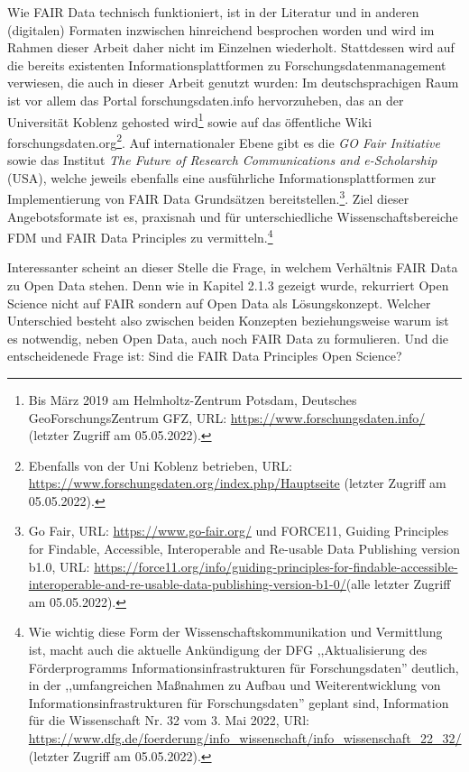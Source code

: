Wie FAIR Data technisch funktioniert, ist in der Literatur und in anderen (digitalen) Formaten inzwischen hinreichend besprochen worden und wird im Rahmen dieser Arbeit daher nicht im Einzelnen wiederholt. Stattdessen wird auf die bereits existenten Informationsplattformen zu Forschungsdatenmanagement verwiesen, die auch in dieser Arbeit genutzt wurden: Im deutschsprachigen Raum ist vor allem das Portal forschungsdaten.info hervorzuheben, das an der Universität Koblenz gehosted wird\footnote{Bis März 2019 am Helmholtz-Zentrum Potsdam, Deutsches GeoForschungsZentrum GFZ, URL: \url{https://www.forschungsdaten.info/} (letzter Zugriff am 05.05.2022).} sowie auf das öffentliche Wiki forschungsdaten.org\footnote{Ebenfalls von der Uni Koblenz betrieben, URL: \url{https://www.forschungsdaten.org/index.php/Hauptseite} (letzter Zugriff am 05.05.2022).}. Auf internationaler Ebene gibt es die \textit{GO Fair Initiative} sowie das Institut \textit{The Future of Research Communications and e-Scholarship} (USA), welche jeweils ebenfalls eine ausführliche Informationsplattformen zur Implementierung von FAIR Data Grundsätzen bereitstellen.\footnote{Go Fair, URL: \url{https://www.go-fair.org/} und FORCE11, Guiding Principles for Findable, Accessible, Interoperable and Re-usable Data Publishing version b1.0, URL: \url{https://force11.org/info/guiding-principles-for-findable-accessible-interoperable-and-re-usable-data-publishing-version-b1-0/}(alle letzter Zugriff am 05.05.2022).}. Ziel dieser Angebotsformate ist es, praxisnah und für unterschiedliche Wissenschaftsbereiche FDM und FAIR Data Principles zu vermitteln.\footnote{Wie wichtig diese Form der Wissenschaftskommunikation und Vermittlung ist, macht auch die aktuelle Ankündigung der DFG ,,Aktualisierung des Förderprogramms Informationsinfrastrukturen für Forschungsdaten'' deutlich, in der ,,umfangreichen Maßnahmen zu Aufbau und Weiterentwicklung von Informationsinfrastrukturen für Forschungsdaten'' geplant sind, Information für die Wissenschaft Nr. 32 vom 3. Mai 2022, URl: \url{https://www.dfg.de/foerderung/info_wissenschaft/info_wissenschaft_22_32/} (letzter Zugriff am 05.05.2022).}

Interessanter scheint an dieser Stelle die Frage, in welchem Verhältnis FAIR Data zu Open Data stehen. Denn wie in Kapitel 2.1.3 gezeigt wurde, rekurriert Open Science nicht auf FAIR sondern auf Open Data als Lösungskonzept. Welcher Unterschied besteht also zwischen beiden Konzepten beziehungsweise warum ist es notwendig, neben Open Data, auch noch FAIR Data zu formulieren. Und die entscheidenede Frage ist: Sind die FAIR Data Principles Open Science? 

